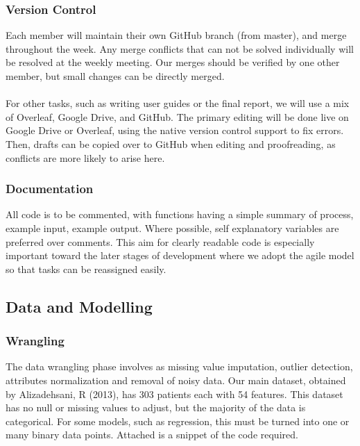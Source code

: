 \documentclass[a4paper, 12pt]{article}
\begin{document}
        \subsubsection{Version Control} \label{ver_ctrl}
        Each member will maintain their own GitHub branch (from master), and merge throughout the week. Any merge conflicts that can not be solved individually will be resolved at the weekly meeting. 
        Our merges should be verified by one other member, but small changes can be directly merged. 
        \\\\
        For other tasks, such as writing user guides or the final report, we will use a mix of Overleaf, Google Drive, and GitHub. The primary editing will be done live on Google Drive or Overleaf, using the native version control support to fix errors. Then, drafts can be copied over to GitHub when editing and proofreading, as conflicts are more likely to arise here.
        \subsubsection{Documentation}
        All code is to be commented, with functions having a simple summary of process, example input, example output. Where possible, self explanatory variables are preferred over comments.
        This aim for clearly readable code is especially important toward the later stages of development where we adopt the agile model so that tasks can be reassigned easily.
        
    \subsection{Data and Modelling}
        \subsubsection{Wrangling}
        The data wrangling phase involves as missing value imputation, outlier detection, attributes normalization and removal of noisy data. Our main dataset, obtained by Alizadehsani, R (2013), has 303 patients each with 54 features. This dataset has no null or missing values to adjust, but the majority of the data is categorical. For some models, such as regression, this must be turned into one or many binary data points. Attached is a snippet of the code required.
\end{document}
